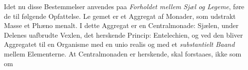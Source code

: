 \documentclass[12pt,a4paper]{book}
\begin{document}
Idet nu disse Bestemmelser anvendes paa \emph{Forholdet
mellem Sjæl og Legeme}, føre de til følgende Opfattelse. Le\-%
gemet er et Aggregat af Monader, som udstrakt Masse et Phæno\-%
menalt. I dette Aggregat er en Centralmonade: Sjælen, under
Delenes uafbrudte Vexlen, det herskende Princip: Entelechien,
og ved den bliver Aggregatet til en Organisme med en unio
realis og med et \emph{substantielt Baand} mellem Elementerne.
At Centralmonaden er herskende, skal forstaaes, ikke som om
\end{document}

